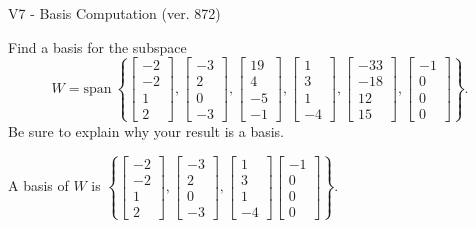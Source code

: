 \begin{exercise}
  \begin{exerciseTitle}V7 - Basis Computation (ver. 872)\end{exerciseTitle}
  \begin{exerciseStatement}
    Find a basis for the subspace 
\[W=\mathrm{span}\ \left\{\left[\begin{array}{r}
-2 \\
-2 \\
1 \\
2
\end{array}\right] , \left[\begin{array}{r}
-3 \\
2 \\
0 \\
-3
\end{array}\right] , \left[\begin{array}{r}
19 \\
4 \\
-5 \\
-1
\end{array}\right] , \left[\begin{array}{r}
1 \\
3 \\
1 \\
-4
\end{array}\right] , \left[\begin{array}{r}
-33 \\
-18 \\
12 \\
15
\end{array}\right] , \left[\begin{array}{r}
-1 \\
0 \\
0 \\
0
\end{array}\right]\right\}.\]
 Be sure to explain why your result is a basis.


  \end{exerciseStatement}
  \begin{exerciseAnswer}
   A basis of \(W\) is  \(\left\{\left[\begin{array}{r}
-2 \\
-2 \\
1 \\
2
\end{array}\right] , \left[\begin{array}{r}
-3 \\
2 \\
0 \\
-3
\end{array}\right] , \left[\begin{array}{r}
1 \\
3 \\
1 \\
-4
\end{array}\right] \left[\begin{array}{r}
-1 \\
0 \\
0 \\
0
\end{array}\right]\right\}\).
  


  \end{exerciseAnswer}
\end{exercise}